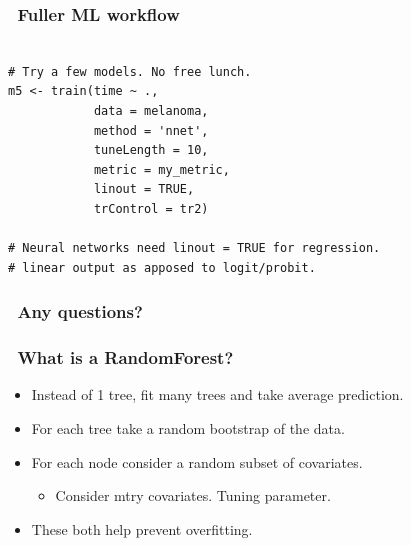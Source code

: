 \documentclass[handout, aspectratio = 169]{beamer}
\begin{document}
\begin{frame}[fragile]
\frametitle{\insertframenumber~Fuller ML workflow}
\begin{Verbatim}

# Try a few models. No free lunch.
m5 <- train(time ~ ., 
            data = melanoma,
            method = 'nnet',
            tuneLength = 10,
            metric = my_metric,
            linout = TRUE,
            trControl = tr2)

# Neural networks need linout = TRUE for regression.
# linear output as apposed to logit/probit.

\end{Verbatim}

\end{frame} 



\begin{frame}
\frametitle{\insertframenumber~Any questions?}


\end{frame} 





\begin{frame}
\frametitle{\insertframenumber~What is a RandomForest?}

\begin{itemize}
\item Instead of 1 tree, fit many trees and take average prediction.
\item For each tree take a random bootstrap of the data.
\item For each node consider a random subset of covariates.
	\begin{itemize}
	\item Consider mtry covariates. Tuning parameter.
	\end{itemize}
\item These both help prevent overfitting.
\end{itemize}
\end{frame} 
\end{document}
